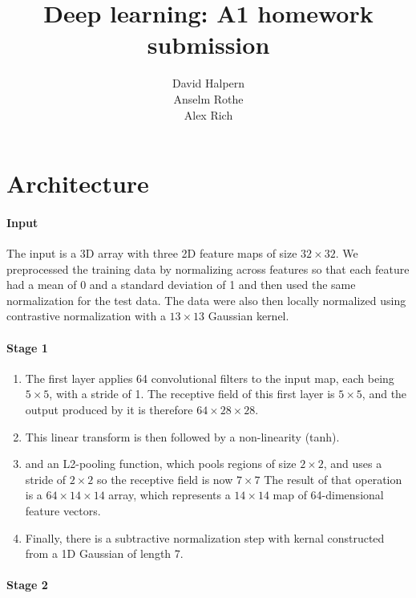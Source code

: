 \documentclass[10pt,letterpaper]{article}
\title{Deep learning: A1 homework submission}
\author{ David Halpern \\
  Anselm Rothe \\
  Alex Rich}
\begin{document}
\maketitle
\section{Architecture}
\label{architecture}

\paragraph{Input}\label{input}

The input is a 3D array with three 2D feature maps of size $32 \times 32$. We preprocessed the training data 
by normalizing across features so that each feature had a mean of 0 and a standard deviation of 1 and then
used the same normalization for the test data. The data were also then locally normalized using contrastive normalization with a $13\times13$ Gaussian kernel.

\paragraph{Stage 1}\label{stage-1}

\begin{enumerate}
\def\labelenumi{\arabic{enumi}.}
\item
  The first layer applies 64 convolutional filters to the input map, each being $5\times5$, with a stride of 1.
  The receptive field of this first layer is $5\times5$, and the output produced
  by it is therefore $64\times28\times28$.
\item
  This linear transform is then followed by a non-linearity (tanh).
\item
  and an L2-pooling function, which pools regions of size $2\times2$, and uses
  a stride of $2\times2$ so the receptive field is now $7\times7$ The result of that
  operation is a $64\times14\times14$ array, which represents a $14\times14$ map of
  64-dimensional feature vectors.
\item
  Finally, there is a subtractive normalization step with kernal
  constructed from a 1D Gaussian of length 7.
\end{enumerate}

\paragraph{Stage 2}\label{stage-2}
\end{document}
